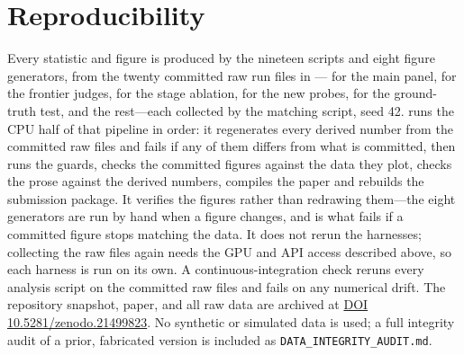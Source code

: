 \documentclass[11pt]{article}
\begin{document}
\section*{Reproducibility}
Every statistic and figure is produced by the nineteen 
scripts and eight  figure generators, from the twenty
committed raw run files in --- for the
main panel,  for the frontier judges,
 for the stage ablation, 
for the new probes,  for the ground-truth test, and the
rest---each collected by the matching  script, seed 42.
 runs the CPU half of that pipeline in order: it regenerates every
derived number from the committed raw files and fails if any of them differs from what
is committed, then runs the guards, checks the committed figures against the data they
plot, checks the prose against the derived numbers, compiles the paper and rebuilds the
submission package. It verifies the figures rather than redrawing them---the eight
 generators are run by hand when a figure changes, and
 is what fails if a committed figure stops matching the data. It does not rerun the harnesses; collecting
the raw files again needs the GPU and API access described above, so each harness is
run on its own.
A continuous-integration check reruns every analysis script on the committed raw files
and fails on any numerical drift. The repository snapshot, paper, and all raw data are
archived at \href{https://doi.org/10.5281/zenodo.21499823}{DOI 10.5281/zenodo.21499823}. No synthetic or
simulated data is used; a full integrity audit of a prior, fabricated version is included
as \texttt{DATA\_INTEGRITY\_AUDIT.md}.
\end{document}
